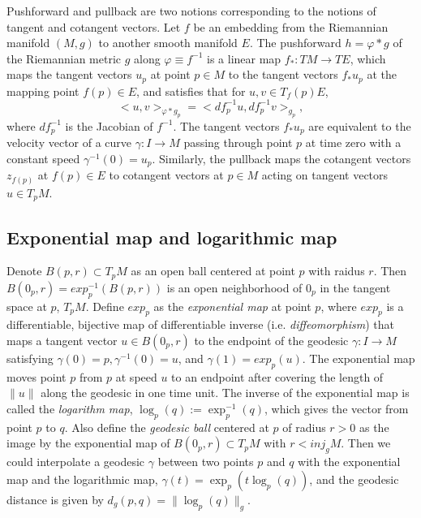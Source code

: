 \documentclass[11pt,a4paper,]{article}
\begin{document}
Pushforward and pullback are two notions corresponding to the notions of
tangent and cotangent vectors. Let \(f\) be an embedding from the
Riemannian manifold \((M,g)\) to another smooth manifold \(E\). The
pushforward \(h=\varphi*g\) of the Riemannian metric \(g\) along
\(\varphi \equiv f^{-1}\) is a linear map \(f_*:TM \rightarrow TE\), which
maps the tangent vectors \(u_p\) at point \(p \in M\) to the tangent vectors
\(f_*u_p\) at the mapping point \(f(p) \in E\), and satisfies that for
\(u, v \in T_f(p)E\), \[
<u,v>_{\varphi*g_p} = <df_p^{-1}u, df_p^{-1}v>_{g_p},
\] where \(df_p^{-1}\) is the Jacobian of \(f^{-1}\). The tangent vectors
\(f_*u_p\) are equivalent to the velocity vector of a curve
\(\gamma: I\rightarrow M\) passing through point \(p\) at time zero with a
constant speed \(\gamma^{-1}(0)=u_p\). Similarly, the pullback maps the
cotangent vectors \(z_{f(p)}\) at \(f(p) \in E\) to cotangent vectors at
\(p \in M\) acting on tangent vectors \(u \in T_pM\).

\hypertarget{exponential-map-and-logarithmic-map}{%
\subsection{Exponential map and logarithmic map}\label{exponential-map-and-logarithmic-map}}

Denote \(B(p, r) \subset T_pM\) as an open ball centered at point \(p\) with
raidus \(r\). Then \(B(0_p, r) = exp_p^{-1}(B(p,r))\) is an open
neighborhood of \(0_p\) in the tangent space at \(p\), \(T_pM\). Define
\(exp_p\) as the \emph{exponential map} at point \(p\), where \(exp_p\) is a
differentiable, bijective map of differentiable inverse (i.e.
\emph{diffeomorphism}) that maps a tangent vector \(u \in B(0_p, r)\) to the
endpoint of the geodesic \(\gamma: I \rightarrow M\) satisfying
\(\gamma(0)=p, \gamma^{-1}(0)=u\), and \(\gamma(1)=exp_p(u)\). The
exponential map moves point \(p\) from \(p\) at speed \(u\) to an endpoint
after covering the length of \(\|u\|\) along the geodesic in one time
unit. The inverse of the exponential map is called the \emph{logarithm map},
\(\log_p(q):= \exp^{-1}_p(q)\), which gives the vector from point \(p\) to
\(q\). Also define the \emph{geodesic ball} centered at \(p\) of radius \(r > 0\)
as the image by the exponential map of \(B(0_p, r) \subset T_pM\) with
\(r < \textit{inj}_gM\). Then we could interpolate a geodesic \(\gamma\)
between two points \(p\) and \(q\) with the exponential map and the
logarithmic map, \(\gamma(t) = \exp_p(t\log_p(q))\), and the geodesic
distance is given by \(d_g(p,q) = \|\log_p(q)\|_g\).
\end{document}
